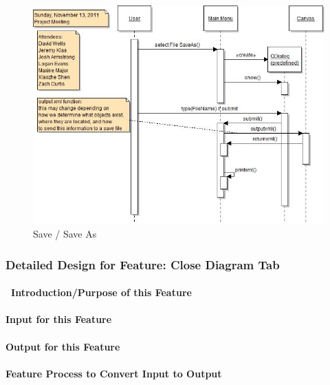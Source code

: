 \documentclass[twoside,letterpaper]{article}
\begin{document}
{\begin{figure}[h]
\centering
\includegraphics[width=6.0in]{IntSaveAs.jpg}
\caption{Save / Save As}
\end{figure}

\clearpage





% 
%

\subsubsection{Detailed Design for Feature: Close Diagram Tab }
\paragraph[\ Introduction/Purpose of this Feature]
{\ Introduction/Purpose of this Feature}
{

}

\paragraph[Input for this Feature]{Input for this Feature}
{

}

\paragraph{Output for this Feature}
{

}

\paragraph{Feature Process to Convert Input to Output}
{

}}
\end{document}
